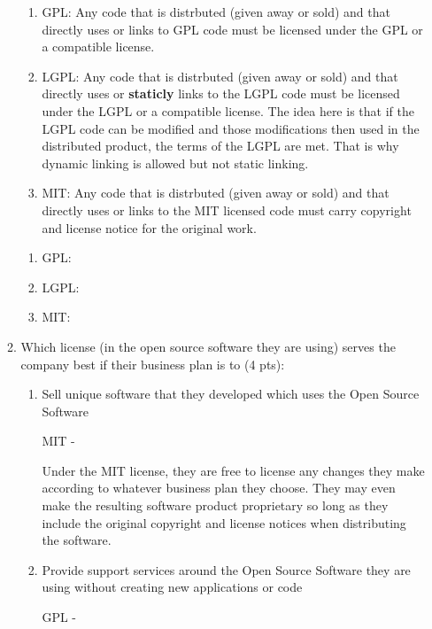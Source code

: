 \documentclass[10pt]{article}
\begin{document}
\begin{enumerate}
\begin{enumerate}
\beginanswers
\begin{enumerate}
\item GPL:
Any code that is distrbuted (given away or sold) and that directly uses or links to GPL code must be licensed under the GPL or a compatible license.
\bigskip
\item LGPL:
Any code that is distrbuted (given away or sold) and that directly uses or \textbf{staticly} links to the LGPL code must be licensed under the LGPL or a compatible license. The idea here is that if the LGPL code can be modified and those modifications then used in the distributed product, the terms of the LGPL are met. That is why dynamic linking is allowed but not static linking.
\bigskip
\item MIT:
Any code that is distrbuted (given away or sold) and that directly uses or links to the MIT licensed code must carry copyright and license notice for the original work.
\bigskip
\end{enumerate}
\else
\begin{enumerate}
	\item GPL:
	\bigskip
	\bigskip
	\bigskip
	\bigskip
	\bigskip
	\item LGPL:
	\bigskip
	\bigskip
	\bigskip
	\bigskip
	\bigskip
	\item MIT:
	\bigskip
	\bigskip
	\bigskip
	\bigskip
	\bigskip
	\end{enumerate}
\fi
\item Which license (in the open source software they are using) serves the company best if their business plan is to (4 pts):
\beginanswers
\begin{enumerate} 
	\item Sell unique software that they developed which uses the Open Source Software
	\bigskip
	
	MIT - 
	
	Under the MIT license, they are free to license any changes they make according to whatever business plan they choose. They may even make the resulting software product proprietary so long as they include the original copyright and license notices when distributing the software.
	\bigskip
	\item Provide support services around the Open Source Software they are using without creating new applications or code
		\bigskip
	
	GPL - 
	

\end{enumerate}
\end{enumerate}
\end{enumerate}
\end{document}

